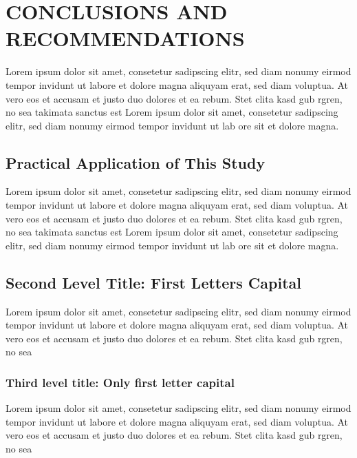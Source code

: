 \chapter{CONCLUSIONS AND RECOMMENDATIONS }\label{ch:ch6}

Lorem ipsum dolor sit amet, consetetur sadipscing elitr, sed diam nonumy eirmod tempor invidunt ut labore et dolore magna aliquyam erat, sed diam voluptua. At vero eos et accusam et justo duo dolores et ea rebum. Stet clita kasd gub rgren, no sea takimata sanctus est Lorem ipsum dolor sit amet, consetetur sadipscing elitr, sed diam nonumy eirmod tempor invidunt ut lab ore sit et dolore magna.

\section{Practical Application of This Study}

Lorem ipsum dolor sit amet, consetetur sadipscing elitr, sed diam nonumy eirmod tempor invidunt ut labore et dolore magna aliquyam erat, sed diam voluptua. At vero eos et accusam et justo duo dolores et ea rebum. Stet clita kasd gub rgren, no sea takimata sanctus est Lorem ipsum dolor sit amet, consetetur sadipscing elitr, sed diam nonumy eirmod tempor invidunt ut lab ore sit et dolore magna.

\section{Second Level Title: First Letters Capital}

Lorem ipsum dolor sit amet, consetetur sadipscing elitr, sed diam nonumy eirmod tempor invidunt ut labore et dolore magna aliquyam erat, sed diam voluptua. At vero eos et accusam et justo duo dolores et ea rebum. Stet clita kasd gub rgren, no sea 

\subsection{Third level title: Only first letter capital}

Lorem ipsum dolor sit amet, consetetur sadipscing elitr, sed diam nonumy eirmod tempor invidunt ut labore et dolore magna aliquyam erat, sed diam voluptua. At vero eos et accusam et justo duo dolores et ea rebum. Stet clita kasd gub rgren, no sea 

